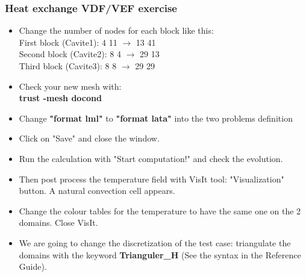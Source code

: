 \documentclass[10pt, hyperref={unicode=true,pdfusetitle, bookmarks=true,bookmarksnumbered=false,bookmarksopen=false, breaklinks=false,pdfborder={0 0 1},backref=true,colorlinks=true,linkcolor=darkblue,pageanchor}]{beamer}
\begin{document}
\begin{frame}
\frametitle{Heat exchange VDF/VEF exercise}
\begin{block}{}

\begin{itemize}
\item Change the number of nodes for each block like this:\\
First block (Cavite1): 4 11 $\rightarrow$ 13 41 \\
Second block (Cavite2): 8 4 $\rightarrow$ 29 13 \\ 
Third block (Cavite3): 8 8  $\rightarrow$ 29 29 \\

\item Check your new mesh with:\\
\textbf{trust -mesh docond } \\

\item Change \textbf{"format lml"} to \textbf{"format lata"} into the two problems definition
\item Click on "Save" and close the window.

\item Run the calculation with "Start computation!" and check the evolution.

\item Then post process the temperature field with VisIt tool: "Visualization" button. A natural convection cell appears.

\item Change the colour tables for the temperature to have the same one on the 2 domains. Close VisIt.

\item We are going to change the discretization of the test case: triangulate the domains with the keyword \textbf{Trianguler\_H} (See the syntax in the Reference Guide).
\end{itemize}

\end{block}
\end{frame}
\end{document}
